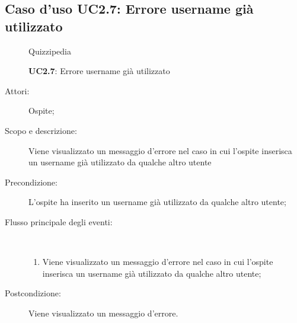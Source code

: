 \subsection{Caso d'uso UC2.7: Errore username già utilizzato}
	\begin{figure}[H]
		\centering
		\begin{resizedtikzpicture}{\textwidth}
		\begin{umlsystem}[x=0, fill=lightgray!20]{Quizzipedia}
		\end{umlsystem}
		\end{resizedtikzpicture}
		\caption{\textbf{UC2.7}: Errore username già utilizzato}
		\label{UC2.7}
	\end{figure}
\begin{description}
\item[Attori:] Ospite;
\item[Scopo e descrizione:] Viene visualizzato un messaggio d'errore nel caso in cui l'ospite inserisca un username già utilizzato da qualche altro utente
      \item[Precondizione:] L'ospite ha inserito un username già utilizzato da qualche altro utente;

        \item[Flusso principale degli eventi:] \ 
 \begin{enumerate}
          \item Viene visualizzato un messaggio d'errore nel caso in cui l'ospite inserisca un username già utilizzato da qualche altro utente;

      \end{enumerate}
    \item[Postcondizione:] Viene visualizzato un messaggio d'errore.
  \end{description}
\hypertarget{UC3}{}
